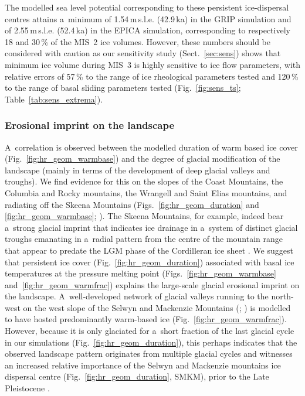 \documentclass[tc, manuscript]{copernicus}
\begin{document}
      The modelled sea level potential corresponding to these persistent
      ice-dispersal centres attains a~minimum of 1.54\,\unit{m}\,s.l.e.
      (42.9\,\unit{ka}) in the GRIP simulation and of 2.55\,\unit{m}\,s.l.e.
      (52.4\,\unit{ka}) in the EPICA simulation, corresponding to
      respectively 18 and 30\,\unit{\%} of the MIS~2 ice volumes.
      However, these numbers should be considered with caution as our
      sensitivity study (Sect.~\ref{sec:sens}) shows that minimum ice volume
      during MIS~3 is highly sensitive to ice flow parameters, with relative
      errors of 57\,\unit{\%} to the range of ice rheological parameters
      tested and 120\,\unit{\%} to the range of basal sliding parameters
      tested (Fig.~\ref{fig:sens_ts}; Table~\ref{tab:sens_extrema}).

\subsubsection{Erosional imprint on the landscape}

      A~correlation is observed between the modelled duration of warm based
      ice cover (Fig.~\ref{fig:hr_geom_warmbase}) and the degree of glacial
      modification of the landscape (mainly in terms of the development of
      deep glacial valleys and troughs). We find evidence for this on the
      slopes of the Coast Mountains, the Columbia and Rocky mountains,
      the Wrangell and Saint Elias mountains, and radiating off the Skeena
      Mountains (Figs.~\ref{fig:hr_geom_duration} and
      \ref{fig:hr_geom_warmbase}; \citealp[Fig.~2]{Kleman.etal.2010}). The
      Skeena Mountains, for example, indeed bear a~strong glacial imprint
      that indicates ice drainage in a~system of distinct glacial troughs
      emanating in a~radial pattern from the centre of the mountain range
      \citep[Fig.~2]{Kleman.etal.2010} that appear to
      predate the LGM phase of the Cordilleran ice sheet
      \citep{Stumpf.etal.2000}. We suggest that persistent ice cover
      (Fig.~\ref{fig:hr_geom_duration}) associated with basal ice
      temperatures at the pressure melting point
      (Figs.~\ref{fig:hr_geom_warmbase} and~\ref{fig:hr_geom_warmfrac})
      explains the large-scale glacial erosional imprint on the landscape.
      A~well-developed network of glacial valleys running to the north-west
      on the west slope of the Selwyn and Mackenzie Mountains
      (\citealp[Fig.~2]{Kleman.etal.2010}; \citealp[Fig.~8]
      {Stroeven.etal.2010}) is modelled to have hosted predominantly
      warm-based ice (Fig.~\ref{fig:hr_geom_warmfrac}). However, because it
      is only glaciated for a~short fraction of the last glacial cycle in
      our simulations (Fig.~\ref{fig:hr_geom_duration}), this perhaps
      indicates that the observed landscape pattern originates from multiple
      glacial cycles and witnesses an increased relative importance of the
      Selwyn and Mackenzie mountains ice dispersal centre
      (Fig.~\ref{fig:hr_geom_duration}, SMKM), prior to the Late Pleistocene
      \citep[cf.][]{Ward.etal.2008, Demuro.etal.2012}.
\end{document}
